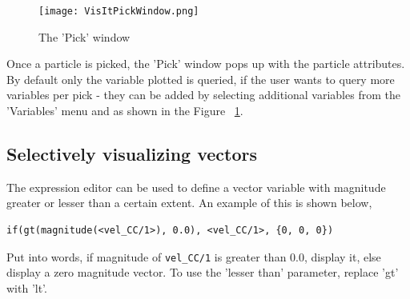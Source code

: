  \begin{figure}
   \vspace{-20pt}
  \centering
  \texttt{[image: VisItPickWindow.png]}
  \caption{The 'Pick' window}
  \label{VisItPickWindow}
\end{figure}

Once a particle is picked, the 'Pick' window pops up with the particle
attributes. By default only the variable plotted is queried, if the
user wants to query more variables per pick - they can be added by
selecting additional variables from the 'Variables' menu and as shown
in the Figure ~\ref{VisItPickWindow}.


\subsection{Selectively visualizing vectors}
The expression editor can be used to define a vector variable with magnitude greater or lesser than a certain extent. An example of this is shown below,
\begin{lstlisting}[backgroundcolor=\color{background}]
if(gt(magnitude(<vel_CC/1>), 0.0), <vel_CC/1>, {0, 0, 0})
\end{lstlisting}

Put into words, if magnitude of \lstinline!vel_CC/1! is greater than 0.0, display it, else display a zero magnitude vector. To use the 'lesser than' parameter, replace 'gt' with 'lt'.


